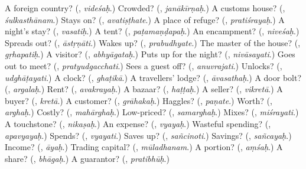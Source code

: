 \begin{tcolorbox}[breakable,colback=teal!4,colframe=teal!35!black,title={Before you move on}]
A foreign country? (\textbf{}, \emph{videśaḥ}.) Crowded? (\textbf{}, \emph{janākīrṇaḥ}.) A customs house? (\textbf{}, \emph{śulkasthānam}.) Stays on? (\textbf{}, \emph{avatiṣṭhate}.) A place of refuge? (\textbf{}, \emph{pratiśrayaḥ}.) A night's stay? (\textbf{}, \emph{vasatiḥ}.) A tent? (\textbf{}, \emph{paṭamaṇḍapaḥ}.) An encampment? (\textbf{}, \emph{niveśaḥ}.) Spreads out? (\textbf{}, \emph{āstṛṇāti}.) Wakes up? (\textbf{}, \emph{prabudhyate}.) The master of the house? (\textbf{}, \emph{gṛhapatiḥ}.) A visitor? (\textbf{}, \emph{abhyāgataḥ}.) Puts up for the night? (\textbf{}, \emph{nivāsayati}.) Goes out to meet? (\textbf{}, \emph{pratyudgacchati}.) Sees a guest off? (\textbf{}, \emph{anuvrajati}.) Unlocks? (\textbf{}, \emph{udghāṭayati}.) A clock? (\textbf{}, \emph{ghaṭikā}.) A travellers' lodge? (\textbf{}, \emph{āvasathaḥ}.) A door bolt? (\textbf{}, \emph{argalaḥ}.) Rent? (\textbf{}, \emph{avakrayaḥ}.) A bazaar? (\textbf{}, \emph{haṭṭaḥ}.) A seller? (\textbf{}, \emph{vikretā}.) A buyer? (\textbf{}, \emph{kretā}.) A customer? (\textbf{}, \emph{grāhakaḥ}.) Haggles? (\textbf{}, \emph{paṇate}.) Worth? (\textbf{}, \emph{arghaḥ}.) Costly? (\textbf{}, \emph{mahārghaḥ}.) Low-priced? (\textbf{}, \emph{samarghaḥ}.) Mixes? (\textbf{}, \emph{miśrayati}.) A touchstone? (\textbf{}, \emph{nikaṣaḥ}.) An expense? (\textbf{}, \emph{vyayaḥ}.) Wasteful spending? (\textbf{}, \emph{apavyayaḥ}.) Spends? (\textbf{}, \emph{vyayati}.) Saves up? (\textbf{}, \emph{sañcinoti}.) Savings? (\textbf{}, \emph{sañcayaḥ}.) Income? (\textbf{}, \emph{āyaḥ}.) Trading capital? (\textbf{}, \emph{mūladhanam}.) A portion? (\textbf{}, \emph{aṃśaḥ}.) A share? (\textbf{}, \emph{bhāgaḥ}.) A guarantor? (\textbf{}, \emph{pratibhūḥ}.)
\end{tcolorbox}
